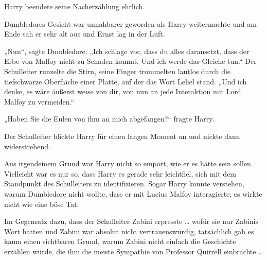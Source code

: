 Harry beendete seine Nacherzählung ehrlich.

Dumbledores Gesicht war unnahbarer geworden als Harry weitermachte und am Ende sah er sehr alt aus und Ernst lag in der Luft.

„Nun“, sagte Dumbledore.
„Ich schlage vor, dass du alles daransetzt, dass der Erbe von Malfoy nicht zu Schaden kommt. Und ich werde das Gleiche tun.“ Der Schulleiter runzelte die Stirn, seine Finger trommelten lautlos durch die tiefschwarze Oberfläche einer Platte, auf der das Wort Leliel stand.
„Und ich denke, es wäre äußerst weise von dir, von nun an jede Interaktion mit Lord Malfoy zu vermeiden.“

„Haben Sie die Eulen von ihm an mich abgefangen?“ fragte Harry.

Der Schulleiter blickte Harry für einen langen Moment an und nickte dann widerstrebend.

Aus irgendeinem Grund war Harry nicht so empört, wie er es hätte sein sollen. Vielleicht war es nur so, dass Harry es gerade sehr leichtfiel, sich mit dem Standpunkt des Schulleiters zu identifizieren. Sogar Harry konnte verstehen, warum Dumbledore nicht wollte, dass er mit Lucius Malfoy interagierte; es wirkte nicht wie eine böse Tat.

Im Gegensatz dazu, dass der Schulleiter Zabini erpresste … wofür sie nur Zabinis Wort hatten und Zabini war absolut nicht vertrauenswürdig, tatsächlich gab es kaum einen sichtbaren Grund, warum Zabini nicht einfach die Geschichte erzählen würde, die ihm die meiste Sympathie von Professor Quirrell einbrachte …

